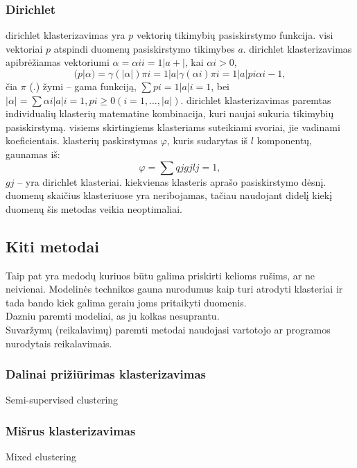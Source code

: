 \documentclass{VUMIFInfKursinis}
\begin{document}
		\subsubsection{Dirichlet}
			dirichlet klasterizavimas yra $p$ vektorių tikimybių pasiskirstymo funkcija. visi vektoriai $p$ atspindi duomenų pasiskirstymo tikimybes $a$. dirichlet klasterizavimas apibrėžiamas vektoriumi $ \alpha = {\alpha i}i=1|a+|$, kai $ \alpha i > 0$,\\
			\begin{equation}
				(p|\alpha)=\gamma(|\alpha|)\pi i=1|a|\gamma (\alpha i)\pi i=1|a|pi \alpha i−1,
			\end{equation}
			čia $\pi$ (.) žymi – gama funkciją, $\sum{pi=1|a|i=1}$, bei $|\alpha| = \sum{\alpha i|a|i=1,pi≥0} (i =1,\ldots,|a|)$.
			dirichlet klasterizavimas paremtas individualių klasterių matematine kombinacija, kuri naujai sukuria tikimybių pasiskirstymą. visiems skirtingiems klasteriams suteikiami svoriai, jie vadinami koeficientais. klasterių paskirstymas $\varphi$, kuris sudarytas iš $l$ komponentų, gaunamas iš:
			\begin{equation}
				\varphi = \sum{qjgjlj=1},
			\end{equation}
			$gj$ – yra dirichlet klasteriai. kiekvienas klasteris aprašo pasiskirstymo dėsnį. duomenų skaičius klasteriuose yra neribojamas, tačiau naudojant didelį kiekį duomenų šis metodas veikia neoptimaliai.

	\subsection{Kiti metodai}
			Taip pat yra medodų kuriuos būtu galima priskirti kelioms rušims, ar ne neivienai. 
		Modelinės technikos gauna nurodumus kaip turi atrodyti klasteriai ir tada bando kiek galima geraiu joms pritaikyti duomenis.\\
		Dazniu paremti modeliai, as ju kolkas nesuprantu.\\
	Suvaržymų (reikalavimų) paremti metodai naudojasi vartotojo ar programos nurodytais reikalavimais.
		\subsubsection{Dalinai prižiūrimas klasterizavimas}
			Semi-supervised clustering
		\subsubsection{Mišrus klasterizavimas}
			Mixed clustering
\end{document}
